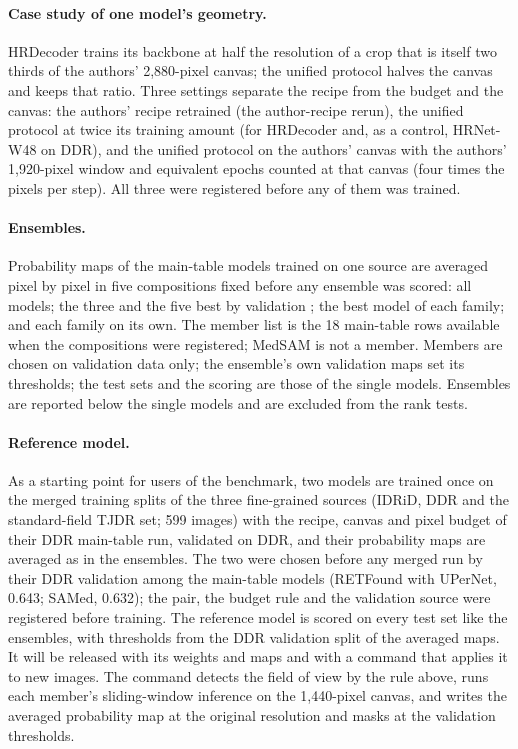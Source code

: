 \paragraph{Case study of one model's geometry.} HRDecoder trains its backbone at half the resolution of a crop that is itself two thirds of the authors' 2,880-pixel canvas; the unified protocol halves the canvas and keeps that ratio. Three settings separate the recipe from the budget and the canvas: the authors' recipe retrained (the author-recipe rerun), the unified protocol at twice its training amount (for HRDecoder and, as a control, HRNet-W48 on DDR), and the unified protocol on the authors' canvas with the authors' 1,920-pixel window and equivalent epochs counted at that canvas (four times the pixels per step). All three were registered before any of them was trained.

\paragraph{Ensembles.} Probability maps of the main-table models trained on one source are averaged pixel by pixel in five compositions fixed before any ensemble was scored: all models; the three and the five best by validation \mAUPR{}; the best model of each family; and each family on its own. The member list is the 18 main-table rows available when the compositions were registered; MedSAM is not a member. Members are chosen on validation data only; the ensemble's own validation maps set its thresholds; the test sets and the scoring are those of the single models. Ensembles are reported below the single models and are excluded from the rank tests.

\paragraph{Reference model.} As a starting point for users of the benchmark, two models are trained once on the merged training splits of the three fine-grained sources (IDRiD, DDR and the standard-field TJDR set; 599 images) with the recipe, canvas and pixel budget of their DDR main-table run, validated on DDR, and their probability maps are averaged as in the ensembles. The two were chosen before any merged run by their DDR validation \mAUPR{} among the main-table models (RETFound with UPerNet, 0.643; SAMed, 0.632); the pair, the budget rule and the validation source were registered before training. The reference model is scored on every test set like the ensembles, with thresholds from the DDR validation split of the averaged maps. It will be released with its weights and maps and with a command that applies it to new images. The command detects the field of view by the rule above, runs each member's sliding-window inference on the 1,440-pixel canvas, and writes the averaged probability map at the original resolution and masks at the validation thresholds.

